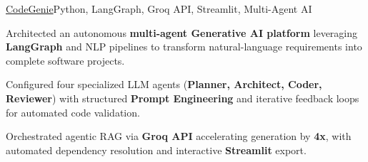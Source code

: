 \begin{cvproject}{\uline{CodeGenie}}{Python, LangGraph, Groq API, Streamlit, Multi-Agent AI}
    \item Architected an autonomous \textbf{multi-agent Generative AI platform} leveraging \textbf{LangGraph} and NLP pipelines to transform natural-language requirements into complete software projects.
    \item Configured four specialized LLM agents (\textbf{Planner, Architect, Coder, Reviewer}) with structured \textbf{Prompt Engineering} and iterative feedback loops for automated code validation.
    \item Orchestrated agentic RAG via \textbf{Groq API} accelerating generation by \textbf{4x}, with automated dependency resolution and interactive \textbf{Streamlit} export.
\end{cvproject}
